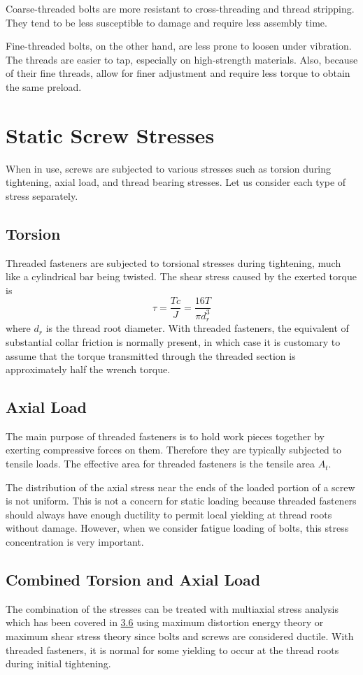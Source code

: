 \documentclass[a4paper,openany,12pt]{book}
\begin{document}
{{Coarse-threaded bolts are more resistant to cross-threading and thread
stripping. They tend to be less susceptible to damage and require less
assembly time.

Fine-threaded bolts, on the other hand, are less prone to loosen under
vibration. The threads are easier to tap, especially on high-strength
materials. Also, because of their fine threads, allow for finer
adjustment and require less torque to obtain the same preload.

\section{Static Screw Stresses}
\label{sec:orga201293}
When in use, screws are subjected to various stresses such as torsion
during tightening, axial load, and thread bearing stresses. Let us
consider each type of stress separately.

\subsection{Torsion}
\label{sec:orga520adf}
Threaded fasteners are subjected to torsional stresses during
tightening, much like a cylindrical bar being twisted. The shear stress
caused by the exerted torque is
$$\tau  = \frac{Tc}{J} = \frac{16T}{\pi d_r^3}$$ where \(d_r\) is the
thread root diameter. With threaded fasteners, the equivalent of
substantial collar friction is normally present, in which case it is
customary to assume that the torque transmitted through the threaded
section is approximately half the wrench torque.

\subsection{Axial Load}
\label{sec:org26e5b28}
The main purpose of threaded fasteners is to hold work pieces together
by exerting compressive forces on them. Therefore they are typically
subjected to tensile loads. The effective area for threaded fasteners is
the tensile area \(A_t\).

The distribution of the axial stress near the ends of the loaded portion
of a screw is not uniform. This is not a concern for static loading
because threaded fasteners should always have enough ductility to permit
local yielding at thread roots without damage. However, when we consider
fatigue loading of bolts, this stress concentration is very important.

\subsection{Combined Torsion and Axial Load}
\label{sec:org8abc087}
The combination of the stresses can be treated with multiaxial stress
analysis which has been covered in \hyperref[sec:org198112e]{3.6}
using maximum distortion energy theory or maximum shear stress theory
since bolts and screws are considered ductile. With threaded fasteners,
it is normal for some yielding to occur at the thread roots during
initial tightening.

}}
\end{document}
